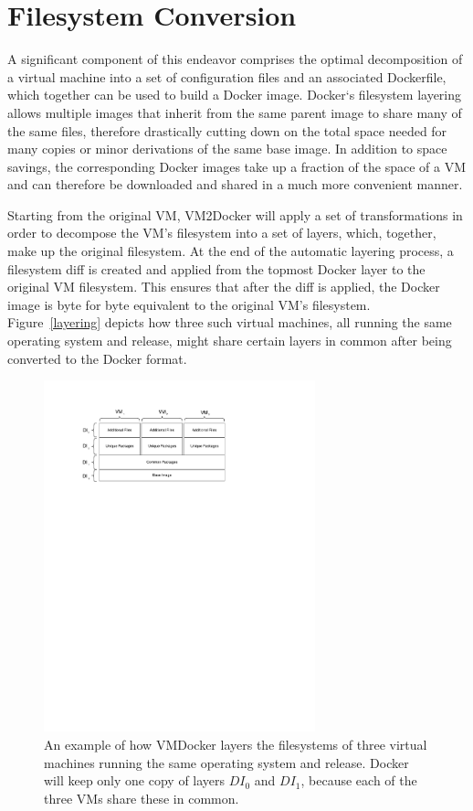 \section{Filesystem Conversion}
A significant component of this endeavor comprises the optimal decomposition of a virtual machine into a set of configuration files and an associated Dockerfile, which together can be used to build a Docker image. Docker`s filesystem layering allows multiple images that inherit from the same parent image to share many of the same files, therefore drastically cutting down on the total space needed for many copies or minor derivations of the same base image. In addition to space savings, the corresponding Docker images take up a fraction of the space of a VM and can therefore be downloaded and shared in a much more convenient manner.

Starting from the original VM, VM2Docker will apply a set of transformations in order to decompose the VM's filesystem into a set of layers, which, together, make up the original filesystem. At the end of the automatic layering process, a filesystem diff is created and applied from the topmost Docker layer to the original VM filesystem. This ensures that after the diff is applied, the Docker image is byte for byte equivalent to the original VM's filesystem. Figure~\ref{layering} depicts how three such virtual machines, all running the same operating system and release, might share certain layers in common after being converted to the Docker format.

\begin{figure}[h]
\label{fig:layering}
\centering
    \includegraphics[width=0.7\textwidth]{layering.pdf}
    \caption{An example of how VMDocker layers the filesystems of three virtual machines running the same operating system and release. Docker will keep only one copy of layers $DI_0$ and $DI_1$, because each of the three VMs share these in common.}
\end{figure}

